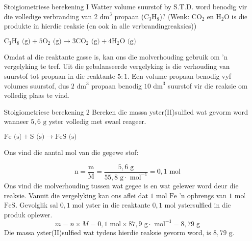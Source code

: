       \begin{wex}{Stoigiometriese berekening I }
{
Watter volume suurstof by S.T.D. word benodig vir die volledige verbranding van $2 {\text{ dm}}^{3}$ propaan ($\text{C}{}_{3}\text{H}{}_{8}$)? (Wenk: $\text{CO}{}_{2}$ en $\text{H}{}_{2}\text{O}$ is die produkte in hierdie reaksie (en ook in alle verbrandingreaksies))
      }
{
${\text{C}}_{3}{\text{H}}_{8} \text{ (g)} + 5{\text{O}}_{2} \text{ (g)} \to 3\text{C}{\text{O}}_{2} \text{ (g)} + 4{\text{H}}_{2}\text{O} \text{ (g)}$
       
Omdat al die reaktante gasse is, kan ons die molverhouding gebruik om 'n vergelyking te tref. Uit die gebalanseerde vergelyking is die verhouding van suurstof tot propaan in die reaktante  $5:1$.
      \label{m38712*id284304}Een volume propaan benodig vyf volumes suurstof, dus $2 {\text{ dm}}^{3}$ propaan benodig $10 {\text{ dm}}^{3}$ suurstof vir die reaksie om volledig plaas te vind.
}
    \end{wex}
    \noindent
\label{m38712*secfhsst!!!underscore!!!id1972} 
      \begin{wex}{Stoigiometriese berekening 2 }
{
      \label{m38712*probfhsst!!!underscore!!!id1973}
      \label{m38712*id284347}Bereken die massa yster(II)sulfied wat gevorm word wanneer $5,6 \text{ g}$ yster volledig met swael reageer.
      }
{
      \label{m38712*id284378}$\text{Fe} \text{ (s)} + \text{S} \text{ (s)} \to \text{FeS} \text{ (s)}$
       
        Ons vind die aantal mol van die gegewe stof:
      \label{m38712*id284430}\nopagebreak\noindent{}
        
    \begin{equation*}
    \text{n}=\frac{\text{m}}{\text{M}}=\frac{5,6 \text{ g}}{55,8 \text{ g} \cdot \text{ mol}^{-1}} = 0,1\text{ mol}
      \end{equation*}
       Ons vind die molverhouding tussen wat gegee is en wat gelewer word deur die reaksie. Vanuit die vergelyking kan ons aflei dat $1 \text{ mol}$ $\text{Fe}$  'n opbrengs van  $1 \text{ mol}$ $\text{FeS}$. Gevolglik sal $0,1\text{ mol}$ yster in die reaktante $0,1 \text{ mol}$ ystersulfied in die produk oplewer. 
      \label{m38712*id284499}\nopagebreak\noindent{}
    \begin{equation*}
    m=n \times M = 0,1 \text{ mol} \times 87,9 \text{ g} \cdot \text{ mol}^{-1} = 8,79 \text{ g}
      \end{equation*}
      \label{m38712*id284548}Die massa yster(II)sulfied wat tydens hierdie reaksie gevorm word, is $8,79 \text{ g}$. 
}
    \end{wex}
    \noindent
